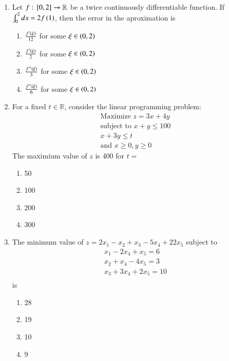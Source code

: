 \documentclass[journal,12pt,onecolumn]{IEEEtran}
\theoremstyle{remark}
\begin{document}
\begin{enumerate}
	\item Let $f: {}\left[0,2\right]\to \mathbb{R}$ be a twice continuously differentiable function. If $\int_{0}^{2} dx=2f\left(1\right)$, then the error in the aproximation is
	\begin{multicols}{2}
	\begin{enumerate}
		\item $\frac{f'\left(\xi\right)}{12}$ for some $\xi \in \left(0,2\right)$
		\item $\frac{f'\left(\xi\right)}{2}$ for some $\xi \in \left(0,2\right)$
 		\item $\frac{f''\left(\xi\right)}{3}$ for some $\xi \in \left(0,2\right)$
		\item $\frac{f''\left(\xi\right)}{6}$ for some $\xi \in \left(0,2\right)$
	\end{enumerate}
	\end{multicols}

	\item For a fixed $t \in \mathbb{R}$, consider the linear programming problem:
\begin{align*}
\text{Maximize } z=3x+4y \\
\text{subject to } x+y \leq 100 \\
x+3y \leq t \\
\text{and } x \geq 0, y\geq 0
\end{align*}
The maximium value of $z$ is 400 for $t=$ 
	\begin{multicols}{4}
	\begin{enumerate}
		\item 50
		\item 100
		\item 200
		\item 300
	\end{enumerate}
	\end{multicols}

\item The minimum value of $z=2x_{1}-x_{2}+x_{3}-5x_{4}+22x_{5}$ subject to
\begin{align*}
	x_{1}-2x_{4}+x_{5}=6\\
	x_{2}+x_{4}-4x_{5}=3\\
	x_{3}+3x_{4}+2x_{5}=10\\
\end{align*}
is
	\begin{multicols}{4}
	\begin{enumerate}
		\item 28
		\item 19
		\item 10
		\item 9
	\end{enumerate}
	\end{multicols}
	

\end{enumerate}
\end{document}
